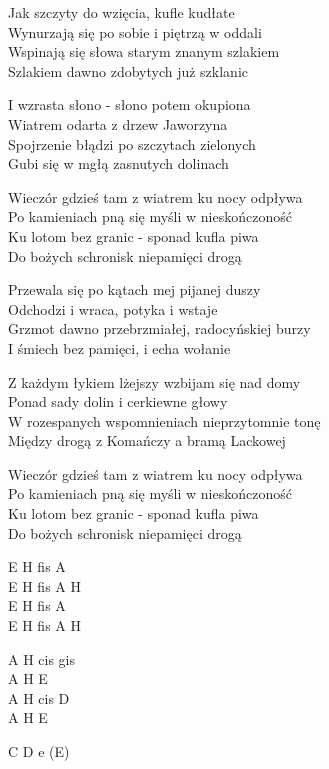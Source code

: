 \begin{text}
Jak szczyty do wzięcia, kufle kudłate\\
Wynurzają się po sobie i piętrzą w oddali\\
Wspinają się słowa starym znanym szlakiem\\
Szlakiem dawno zdobytych już szklanic

I wzrasta słono - słono potem okupiona\\
Wiatrem odarta z drzew Jaworzyna\\
Spojrzenie błądzi po szczytach zielonych\\
Gubi się w mgłą zasnutych dolinach

\vin Wieczór gdzieś tam z wiatrem ku nocy odpływa\\
\vin Po kamieniach pną się myśli w nieskończoność\\
\vin Ku lotom bez granic - sponad kufla piwa\\
\vin Do bożych schronisk niepamięci drogą

Przewala się po kątach mej pijanej duszy\\
Odchodzi i wraca, potyka i wstaje\\
Grzmot dawno przebrzmiałej, radocyńskiej burzy\\
I śmiech bez pamięci, i echa wołanie

Z każdym łykiem lżejszy wzbijam się nad domy\\
Ponad sady dolin i cerkiewne głowy\\
W rozespanych wspomnieniach nieprzytomnie tonę\\
Między drogą z Komańczy a bramą Lackowej

\vin Wieczór gdzieś tam z wiatrem ku nocy odpływa\\
\vin Po kamieniach pną się myśli w nieskończoność\\
\vin Ku lotom bez granic - sponad kufla piwa\\
\vin Do bożych schronisk niepamięci drogą
\end{text}
\begin{chord}
    E H fis A\\
    E H fis A H\\
    E H fis A\\
    E H fis A H

    \hfill\break
    \hfill\break
    \hfill\break

    A H cis gis\\
    A H E\\
    A H cis D\\
    A H E

    \hfill\break
    \hfill\break
    \hfill\break
    \hfill\break

    \hfill\break
    \hfill\break
    \hfill\break
    \hfill\break

    \hfill\break
    C D e (E)
\end{chord}
